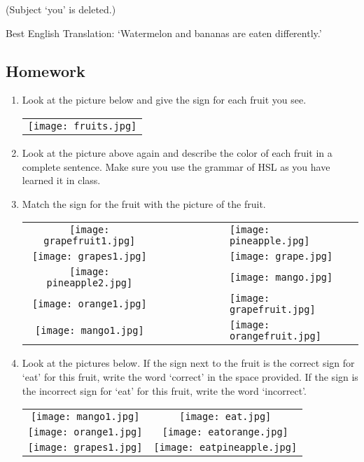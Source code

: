 \documentclass{tufte-book}
\begin{document}
\begin{fullwidth}
(Subject `you' is deleted.)

Best English Translation: `Watermelon and bananas are eaten differently.'
\end{fullwidth}
\newpage
\subsection{Homework}
\begin{enumerate}
\item Look at the picture below and give the sign for each fruit you see.
 \begin{table*}[h!]
\begin{tabular}{c }
\texttt{[image: fruits.jpg]}
\end{tabular}
\end{table*}
\item Look at the picture above again and describe the color of each fruit in a complete sentence. Make sure you use the grammar of HSL as you have learned it in class.
\item Match the sign for the fruit with the picture of the fruit.
 \begin{table*}[h!]
\begin{tabular}{c c c c cccl}
\texttt{[image: grapefruit1.jpg]} & &&& &&&\texttt{[image: pineapple.jpg]}\\
\texttt{[image: grapes1.jpg]} & &&& &&&\texttt{[image: grape.jpg]}\\
\texttt{[image: pineapple2.jpg]} & &&& &&&\texttt{[image: mango.jpg]}\\
\texttt{[image: orange1.jpg]} & &&& &&&\texttt{[image: grapefruit.jpg]}\\
\texttt{[image: mango1.jpg]} & &&& &&&\texttt{[image: orangefruit.jpg]}\\
\end{tabular}
\end{table*}
\newpage
\item Look at the pictures below. If the sign next to the fruit is the correct sign for `eat' for this fruit, write the word `correct' in the space provided. If the sign is the incorrect sign for `eat' for this fruit, write the word `incorrect'.

 \begin{table*}[h!]
\begin{tabular}{c c}
\texttt{[image: mango1.jpg]} & \texttt{[image: eat.jpg]}\\
\texttt{[image: orange1.jpg]} & \texttt{[image: eatorange.jpg]}\\
\texttt{[image: grapes1.jpg]} & \texttt{[image: eatpineapple.jpg]}\\



\end{tabular}
\end{table*}
\end{enumerate}
\end{document}
